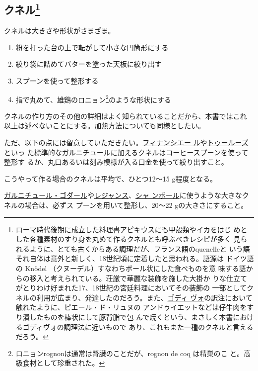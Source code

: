 \hypertarget{ux30afux30cdux30eb54}{%
\subsection[クネル]{\texorpdfstring{クネル\footnote{ローマ時代後期に成立した料理書アピキウスにも甲殻類やイカをはじ
  めとした各種素材のすり身を丸めて作るクネルとも呼ぶべきレシピが多く
  見られるように、とても古くからある調理だが、フランス語のquenelleと
  いう語それ自体は意外と新しく、18世紀頃に定着したと思われる。語源は
  ドイツ語の Knödel （クヌーデル）すなわちボール状にした食べものを意
  味する語からの移入と考えられている。荘厳で華麗な装飾を施した大掛か
  りな仕立てがとりわけ好まれた17、18世紀の宮廷料理においてその装飾の
  一部としてクネルの利用が広まり、発達したのだろう。また、\protect\hyperlink{godiveau}{ゴディ
  ヴォ}の訳注において触れたように、ピエール・ド・リュヌの
  アンドゥイエットなどは仔牛肉をすり潰したものを棒状にして豚背脂で包
  んで焼くという、まさしく本書におけるゴディヴォの調理法に近いもので
  あり、これもまた一種のクネルと言えるだろう。}}{クネル}}\label{ux30afux30cdux30eb54}}


クネルは大きさや形状がさまざま。

\begin{enumerate}
\def\labelenumi{\arabic{enumi}.}
\item
  粉を打った台の上で転がして小さな円筒形にする
\item
  絞り袋に詰めてバターを塗った天板に絞り出す
\item
  スプーンを使って整形する
\item
  指で丸めて、雄鶏のロニョン\footnote{ロニョンrognonは通常は腎臓のことだが、rognon
    de coq は精巣のこ と。高級食材として珍重された。}のような形状にする
\end{enumerate}

クネルの作り方のその他の詳細はよく知られていることだから、本書ではこれ
以上は述べないことにする。加熱方法についても同様としたい。

ただ、以下の点には留意していただきたい。\protect\hyperlink{garniture-financiere}{フィナンシエー
ル}や\protect\hyperlink{garniture-toulouse}{トゥールーズ}といっ
た標準的なガルニチュールに加えるクネルはコーヒースプーンを使って整形す
るか、丸口あるいは刻み模様が入る口金を使って絞り出すこと。

こうやって作る場合のクネルは平均で、ひとつ12〜15 g程度となる。

\protect\hyperlink{garniture-godard}{ガルニチュール・ゴダール}や\protect\hyperlink{garniture-regence}{レジャンス}、\protect\hyperlink{garniture-chambole}{シャ
ンボール}に使うような大きなクネルの場合は、必ずス
プーンを用いて整形し、20〜22 gの大きさにすること。

